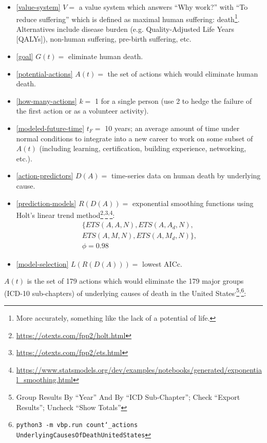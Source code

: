\documentclass[12pt, a4paper, twocolumn]{article}
\begin{document}
\begin{itemize}
  \item \eqref{value-system} $V = $ a value system which answers \enquote{Why work?} with \enquote{To reduce suffering} which is defined as maximal human suffering: death\footnote{More accurately, something like the lack of a potential of life.}. Alternatives include disease burden (e.g. Quality-Adjusted Life Years [QALYs]\cite{weinstein2009qalys}), non-human suffering, pre-birth suffering, etc.
  \item \eqref{goal} $G(t) = $ eliminate human death.
  \item \eqref{potential-actions} $A(t) = $ the set of actions which would eliminate human death.
  \item \eqref{how-many-actions} $k = $ 1 for a single person (use 2 to hedge the failure of the first action or as a volunteer activity).
  \item \eqref{modeled-future-time} $t_F = $ 10 years; an average amount of time under normal conditions to integrate into a new career to work on some subset of $A(t)$ (including learning, certification, building experience, networking, etc.).
  \item \eqref{action-predictors} $D(A) = $ time-series data on human death by underlying cause.
  \item \eqref{prediction-models} $R(D(A)) = $ exponential smoothing functions using Holt's linear trend method\footnote{\url{https://otexts.com/fpp2/holt.html}}\textsuperscript{,}\footnote{\url{https://otexts.com/fpp2/ets.html}}\textsuperscript{,}\footnote{\url{https://www.statsmodels.org/dev/examples/notebooks/generated/exponential_smoothing.html}}:
    \begin{equation*}
      \begin{gathered}
        \{ETS(A,A,N),ETS(A,A_d,N),\\
        ETS(A,M,N),ETS(A,M_d,N)\},\\
        \phi=0.98
      \end{gathered}
    \end{equation*}
  \item \eqref{model-selection} $L(R(D(A))) = $ lowest AICc.
\end{itemize}

$A(t)$ is the set of 179 actions which would eliminate the 179 major groups (ICD-10 sub-chapters\cite{icd10}) of underlying causes of death in the United States\cite{centers2017underlying}\textsuperscript{,}\footnote{Group Results By \enquote{Year} And By \enquote{ICD Sub-Chapter}; Check \enquote{Export Results}; Uncheck \enquote{Show Totals}}\textsuperscript{,}\footnote{\texttt{python3 -m vbp.run count\char`_actions UnderlyingCausesOfDeathUnitedStates}}:
\end{document}

